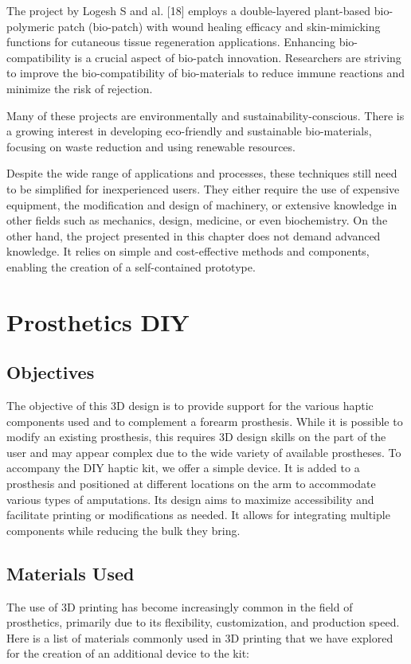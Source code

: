 The project by Logesh S and al. [18] employs a double-layered plant-based bio-polymeric patch (bio-patch) with wound healing efficacy and skin-mimicking functions for cutaneous tissue regeneration applications. Enhancing bio-compatibility is a crucial aspect of bio-patch innovation. Researchers are striving to improve the bio-compatibility of bio-materials to reduce immune reactions and minimize the risk of rejection.

Many of these projects are environmentally and sustainability-conscious. There is a growing interest in developing eco-friendly and sustainable bio-materials, focusing on waste reduction and using renewable resources.

Despite the wide range of applications and processes, these techniques still need to be simplified for inexperienced users. They either require the use of expensive equipment, the modification and design of machinery, or extensive knowledge in other fields such as mechanics, design, medicine, or even biochemistry. On the other hand, the project presented in this chapter does not demand advanced knowledge. It relies on simple and cost-effective methods and components, enabling the creation of a self-contained prototype.

\section{Prosthetics DIY}

\subsection{Objectives}

The objective of this 3D design is to provide support for the various haptic components used and to complement a forearm prosthesis. While it is possible to modify an existing prosthesis, this requires 3D design skills on the part of the user and may appear complex due to the wide variety of available prostheses. To accompany the DIY haptic kit, we offer a simple device. It is added to a prosthesis and positioned at different locations on the arm to accommodate various types of amputations. Its design aims to maximize accessibility and facilitate printing or modifications as needed. It allows for integrating multiple components while reducing the bulk they bring.

\subsection{Materials Used}
The use of 3D printing has become increasingly common in the field of prosthetics, primarily due to its flexibility, customization, and production speed. Here is a list of materials commonly used in 3D printing that we have explored for the creation of an additional device to the kit:

